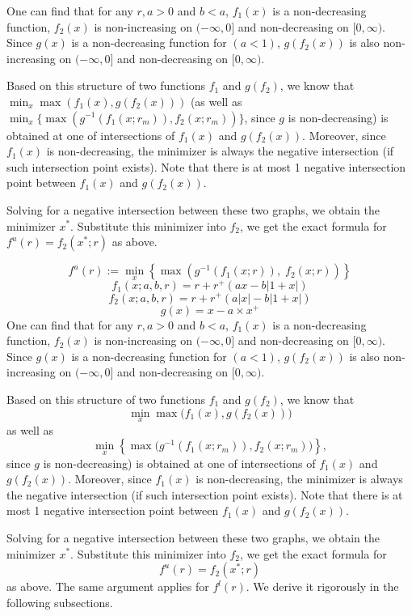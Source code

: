 \documentclass[notitlepage,reqno,11pt]{amsart}
\numberwithin{equation}{section}
\begin{document}
One can find that for any $r,a>0$ and $b<a$, $f_1(x)$ is a non-decreasing function, $f_2(x)$ is non-increasing on $(-\infty,0]$ and non-decreasing on $[0,\infty)$. Since $g(x)$ is a non-decreasing function for $(a<1)$, $g(f_2(x))$ is also non-increasing on $(-\infty,0]$ and non-decreasing on $[0,\infty)$.

Based on this structure of two functions $f_1$ and $g(f_2)$, we know that $\min_x\max(f_1(x),g(f_2(x)))$ (as well as $\min_x\{\max(g^{-1}(f_1(x;r_m)), f_2(x;r_m))\}$, since $g$ is non-decreasing) is obtained at one of intersections of $f_1(x)$ and $g(f_2(x))$. Moreover, since $f_1(x)$ is non-decreasing, the minimizer is always the negative intersection (if such intersection point exists). Note that there is at most 1 negative intersection point between $f_1(x)$ and $g(f_2(x))$.

Solving for a negative intersection between these two graphs, we obtain the minimizer $x^*$. Substitute this minimizer into $f_2$, we get the exact formula for $f^u(r) = f_2(x^*;r)$ as above.

\[
f^{u}(r) := \min_{x} \left\{ \max \left( g^{-1}(f_1(x; r)), \; f_2(x; r) \right) \right\}
\]\[
f_1(x; a, b, r) = r + r^{+}(ax - b|1 + x|)
\]
\[
f_2(x; a, b, r) = r + r^{+}(a|x| - b|1 + x|)
\]
\[
g(x) = x - a \times x^{+}
\]
One can find that for any $r, a > 0$ and $b < a$, $f_{1}(x)$ is a non-decreasing function, 
$f_{2}(x)$ is non-increasing on $(-\infty,0]$ and non-decreasing on $[0,\infty)$. 
Since $g(x)$ is a non-decreasing function for $(a < 1)$, $g(f_{2}(x))$ is also 
non-increasing on $(-\infty,0]$ and non-decreasing on $[0,\infty)$.

Based on this structure of two functions $f_{1}$ and $g(f_{2})$, we know that
\[
\min_{x} \max \big(f_{1}(x), g(f_{2}(x))\big)
\]
as well as 
\[
\min_{x}\left\{ \max \big(g^{-1}(f_{1}(x;r_m)), f_{2}(x;r_m)\big) \right\},
\]
since $g$ is non-decreasing) is obtained at one of intersections of $f_{1}(x)$ and $g(f_{2}(x))$. 
Moreover, since $f_{1}(x)$ is non-decreasing, the minimizer is always the negative intersection 
(if such intersection point exists). Note that there is at most 1 negative intersection point between 
$f_{1}(x)$ and $g(f_{2}(x))$.

Solving for a negative intersection between these two graphs, we obtain the minimizer $x^{*}$. 
Substitute this minimizer into $f_{2}$, we get the exact formula for
\[
f^{u}(r) = f_{2}(x^{*};r)
\]
as above. The same argument applies for $f^l(r)$. We derive it rigorously in the following subsections.
\end{document}
